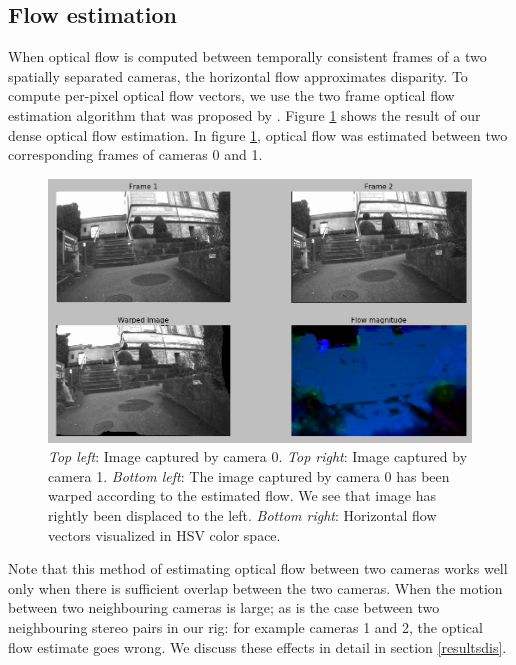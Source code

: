 \documentclass[10pt,twocolumn,letterpaper]{article}
\begin{document}
\subsection{Flow estimation}
\label{sec:flow}
When optical flow is computed between temporally consistent frames of a two spatially separated cameras, the horizontal flow approximates disparity. To compute per-pixel optical flow vectors, we use the two frame optical flow estimation algorithm that was proposed by \cite{farneback}. Figure \ref{fig:optical-flow-01} shows the result of our dense optical flow estimation. In figure \ref{fig:optical-flow-01}, optical flow was estimated between two corresponding frames of cameras 0 and 1. 
\begin{figure}
\centering
\includegraphics[width=\linewidth]{../results/optical-flow/cam0-cam1-proper.png}
\caption{\textit{Top left}:  Image captured by camera 0. \textit{Top right}: Image captured by camera 1. \textit{Bottom left}: The image captured by camera 0 has been warped according to the estimated flow. We see that image has rightly been displaced to the left. \textit{Bottom right}: Horizontal flow vectors visualized in HSV color space.}
\label{fig:optical-flow-01}
\end{figure}

Note that this method of estimating optical flow between two cameras works well only when there is sufficient overlap between the two cameras. When the motion between two neighbouring cameras is large; as is the case between two neighbouring stereo pairs in our rig: for example cameras 1 and 2, the optical flow estimate goes wrong. We discuss these effects in detail in section \ref{resultsdis}.
\end{document}
